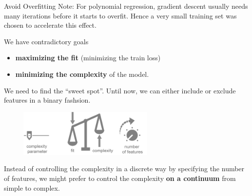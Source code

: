 \documentclass[11pt,compress,t,notes=noshow, xcolor=table]{beamer}
\begin{document}
\begin{vbframe}{Avoid Overfitting}
\footnotesize{Note: For polynomial regression, gradient descent usually needs many iterations before it starts to overfit. Hence a very small training set was chosen to accelerate this effect.}

\framebreak 

We have contradictory goals

\begin{itemize}
\item \textbf{maximizing the fit} (minimizing the train loss)
\item \textbf{minimizing the complexity} of the model.
\end{itemize}

We need to find the \enquote{sweet spot}. Until now, we can either include or exclude features in a binary fashsion.

\begin{center}
\begin{figure}
\includegraphics[width=0.6\textwidth]{figure_man/complexity-vs-fit2.png}
\end{figure}
\end{center}

Instead of controlling the complexity in a discrete way by specifying the number of features,
we might prefer to control the complexity  \textbf{on a continuum} from simple to complex.


\end{vbframe}

\end{document}

